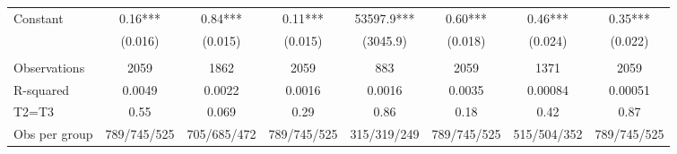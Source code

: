 \begin{tabular}{lccccccc}
Constant  & 0.16*** & 0.84*** & 0.11*** & 53597.9*** & 0.60*** & 0.46*** & 0.35*** \\
      & (0.016) & (0.015) & (0.015) & (3045.9) & (0.018) & (0.024) & (0.022) \\
      &       &       &       &       &       &       &  \\
\midrule
Observations & 2059  & 1862  & 2059  & 883   & 2059  & 1371  & 2059 \\
R-squared & 0.0049 & 0.0022 & 0.0016 & 0.0016 & 0.0035 & 0.00084 & 0.00051 \\
T2=T3 & 0.55  & 0.069 & 0.29  & 0.86  & 0.18  & 0.42  & 0.87 \\
Obs per group & 789/745/525 & 705/685/472 & 789/745/525 & 315/319/249 & 789/745/525 & 515/504/352 & 789/745/525 \\
\bottomrule
\bottomrule
\end{tabular}%
